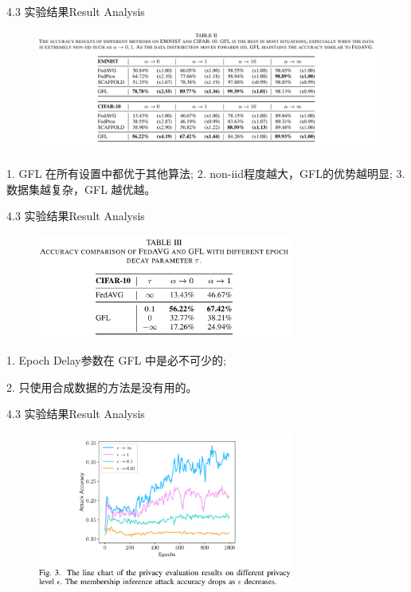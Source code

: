 \documentclass{sintefbeamer}
\theoremstyle{definition}
\begin{document}
\begin{frame}{4.3 实验结果}{Result Analysis}
\begin{figure}[ht]
\centering
\includegraphics[width=1.\textwidth]{images/res_table2}
\end{figure}
	1. GFL 在所有设置中都优于其他算法; 2. non-iid程度越大，GFL的优势越明显; 3.数据集越复杂，GFL 越优越。
\end{frame}

\begin{frame}{4.3 实验结果}{Result Analysis}

\begin{figure}[ht]
\centering
\includegraphics[width=0.75\textwidth]{images/res_table3}
\end{figure}
	
	1. Epoch Delay参数在 GFL 中是必不可少的;
	 
	2. 只使用合成数据的方法是没有用的。
\end{frame}

\begin{frame}{4.3 实验结果}{Result Analysis}

\begin{figure}[ht]
\centering
	\includegraphics[width=0.75\textwidth]{images/res_fig3}
	\end{figure}
\end{frame}
\end{document}
